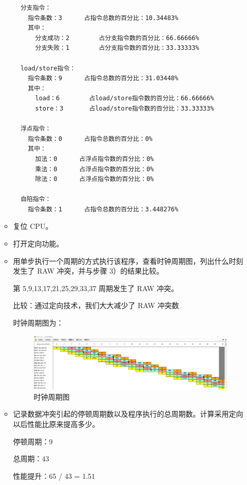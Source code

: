 \documentclass[blue,normal,cn]{elegantnote}
\begin{document}
\begin{enumerate}[wide=0pt, listparindent=2em, parsep=0pt]
\begin{itemize}[leftmargin=3em, listparindent=2em, parsep=0pt]
\begin{lstlisting}
  分支指令：
    指令条数：3		占指令总数的百分比：10.34483%
    其中：
      分支成功：2		占分支指令数的百分比：66.66666%
      分支失败：1		占分支指令数的百分比：33.33333%

  load/store指令：
    指令条数：9		占指令总数的百分比：31.03448%
    其中：
      load：6		占load/store指令数的百分比：66.66666%
      store：3		占load/store指令数的百分比：33.33333%

  浮点指令：
    指令条数：0		占指令总数的百分比：0%
    其中：
      加法：0		占浮点指令数的百分比：0%
      乘法：0		占浮点指令数的百分比：0%
      除法：0		占浮点指令数的百分比：0%

  自陷指令：
    指令条数：1		占指令总数的百分比：3.448276%
\end{lstlisting}
          \item 复位 CPU。
          \item 打开定向功能。
          \item 用单步执行一个周期的方式执行该程序，查看时钟周期图，列出什么时刻发生了 RAW 冲突，并与步骤 3）的结果比较。

                \textcolor{ans}{第 5,9,13,17,21,25,29,33,37 周期发生了 RAW 冲突。}

                \textcolor{ans}{比较：通过定向技术，我们大大减少了 RAW 冲突数}

                \textcolor{ans}{时钟周期图为：}

                \begin{figure}[H]
                  \centering
                  \includegraphics[width=1\textwidth]{fig/bypass.png}
                  \caption{时钟周期图}
                  \label{fig:bypass}
                \end{figure}

          \item 记录数据冲突引起的停顿周期数以及程序执行的总周期数。计算采用定向以后性能比原来提高多少。

                \textcolor{ans} {停顿周期：9}

                \textcolor{ans} {总周期：43}

                \textcolor{ans} {性能提升：65 / 43 = 1.51}


\end{itemize}
\end{enumerate}
\end{document}
